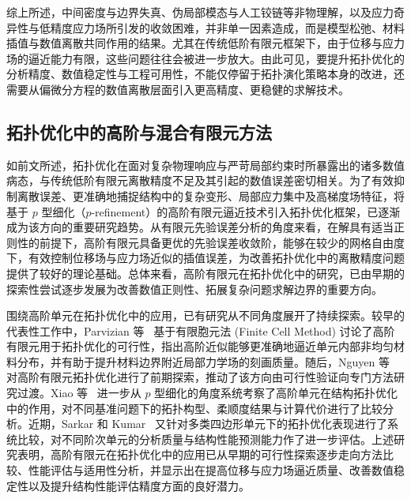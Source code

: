 综上所述，中间密度与边界失真、伪局部模态与人工铰链等非物理解，以及应力奇异性与低精度应力场所引发的收敛困难，并非单一因素造成，而是模型松弛、材料插值与数值离散共同作用的结果。尤其在传统低阶有限元框架下，由于位移与应力场的逼近能力有限，这些问题往往会被进一步放大。由此可见，要提升拓扑优化的分析精度、数值稳定性与工程可用性，不能仅停留于拓扑演化策略本身的改进，还需要从偏微分方程的数值离散层面引入更高精度、更稳健的求解技术。


\subsection{拓扑优化中的高阶与混合有限元方法}
\label{subsec:higher_order_fem_mfem}

如前文所述，拓扑优化在面对复杂物理响应与严苛局部约束时所暴露出的诸多数值病态，与传统低阶有限元离散精度不足及其引起的数值误差密切相关。为了有效抑制离散误差、更准确地捕捉结构中的复杂变形、局部应力集中及高梯度场特征，将基于 $p$ 型细化（$p$-refinement）的高阶有限元逼近技术引入拓扑优化框架，已逐渐成为该方向的重要研究趋势。从有限元先验误差分析的角度来看，在解具有适当正则性的前提下，高阶有限元具备更优的先验误差收敛阶，能够在较少的网格自由度下，有效控制位移场与应力场近似的插值误差，为改善拓扑优化中的离散精度问题提供了较好的理论基础。总体来看，高阶有限元在拓扑优化中的研究，已由早期的探索性尝试逐步发展为改善数值正则性、拓展复杂问题求解边界的重要方向。

围绕高阶单元在拓扑优化中的应用，已有研究从不同角度展开了持续探索。较早的代表性工作中，Parvizian 等~\cite{parvizianTopologyOptimizationUsing2012a} 基于有限胞元法 (Finite Cell Method) 讨论了高阶有限元用于拓扑优化的可行性，指出高阶近似能够更准确地逼近单元内部非均匀材料分布，并有助于提升材料边界附近局部力学场的刻画质量。随后，Nguyen 等~\cite{nguyenHighorderFiniteElements2013} 对高阶有限元拓扑优化进行了前期探索，推动了该方向由可行性验证向专门方法研究过渡。Xiao 等~\cite{xiaoRevisitingPrefinementStructural2021a} 进一步从 $p$ 型细化的角度系统考察了高阶单元在结构拓扑优化中的作用，对不同基准问题下的拓扑构型、柔顺度结果与计算代价进行了比较分析。近期，Sarkar 和 Kumar~\cite{sarkarTopologyOptimizationQuadrilateral2025a} 又针对多类四边形单元下的拓扑优化表现进行了系统比较，对不同阶次单元的分析质量与结构性能预测能力作了进一步评估。上述研究表明，高阶有限元在拓扑优化中的应用已从早期的可行性探索逐步走向方法比较、性能评估与适用性分析，并显示出在提高位移与应力场逼近质量、改善数值稳定性以及提升结构性能评估精度方面的良好潜力。

